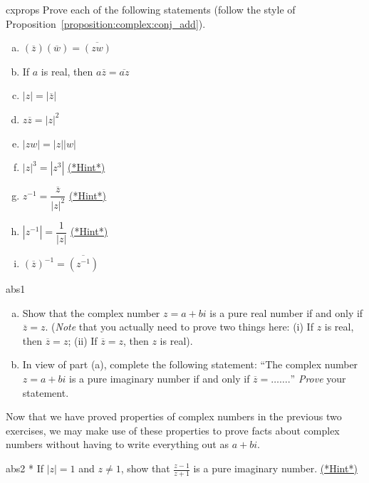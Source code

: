 \begin{exercise}{cxprops}
Prove each of the following statements (follow the style of Proposition~\ref{proposition:complex:conj_add}).
\begin{multicols}{2}
\begin{enumerate}[(a)]
\item 
$(\overline{z}) (\overline{w}) = \overline{(zw)}$
\item
If $a$ is real, then $a \overline{z} = \overline{az}$
\item
$|z| = | \overline{z}|$
\item
$z \overline{z} = |z|^2$
 \item
$|z w| = |z|  |w|$
\item
$|z|^3 = |z^3|$ 
\hyperref[sec:complex:hints]{(*Hint*)}
\item
$z^{-1} = \dfrac{\overline{z}}{|z|^2}$ 
\hyperref[sec:complex:hints]{(*Hint*)}

\item
$|z^{-1}| = \dfrac{1}{|z|}$
\hyperref[sec:complex:hints]{(*Hint*)}

\item
$(\overline{z})^{-1} = \overline {\left( z^{-1} \right )}$
\end{enumerate}
\end{multicols}
\end{exercise}

\begin{exercise}{abs1}
\begin{enumerate}[(a)]
\item
Show that the complex number $z=a+bi$ is a pure real number if and only if $\overline{z} = z$.  (\emph{Note} that you actually need to prove two things here: (i) If $z$ is real, then $\overline{z} = z$; (ii) If $\overline{z} = z$, then $z$ is real).
\item
In view of part (a), complete the following statement:  ``The complex number $z=a+bi$ is a pure imaginary number if and only if $\overline{z} = \ldots \ldots.$'' \emph{Prove} your statement.
\end{enumerate}
\end{exercise}

Now that we have proved properties of complex numbers in the previous two exercises, we may make use of these properties to prove facts about complex numbers  without having to write everything out as $a + bi$.  

\begin{exercise}{abs2}
* If $|z| = 1$ and $z \neq 1$, show that $\frac{z - 1}{z+1}$ is a pure imaginary number. 
\hyperref[sec:complex:hints]{(*Hint*)}
\end{exercise}

